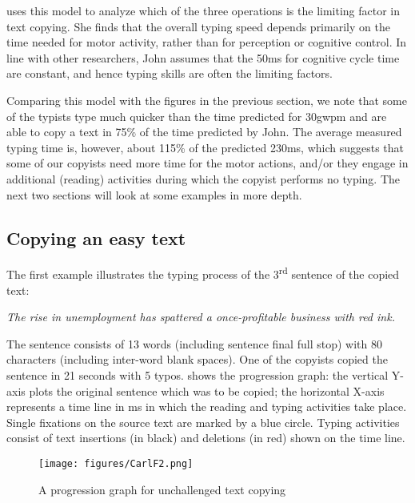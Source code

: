 \documentclass[output=paper]{LSP/langsci}
\begin{document}
\citeauthor{John1996} uses this model to analyze which of the three operations is the limiting factor in text copying. She finds that the overall typing speed depends primarily on the time needed for motor activity, rather than for perception or cognitive control. In line with other researchers, John assumes that the 50ms for cognitive cycle time are constant, and hence typing skills are often the limiting factors.

Comparing this model with the figures in the previous section, we note that some of the typists type much quicker than the time predicted for 30gwpm and are able to copy a text in 75\% of the time predicted by John. The average measured typing time is, however, about 115\% of the predicted 230ms, which suggests that some of our copyists need more time for the motor actions, and/or they engage in additional (reading) activities during which the copyist performs no typing. The next two sections will look at some examples in more depth.

\subsection{Copying an easy text}\label{sec:carl:3.2}
 
The first example illustrates the typing process of the 3\textsuperscript{rd} sentence of the copied text: 

\ea\label{ex:carl:1}
\textit{The rise in unemployment has spattered a once-profitable business with red ink.}
\z

The sentence consists of 13 words (including sentence final full stop) with 80 characters (including inter-word blank spaces). One of the copyists copied the sentence in 21 seconds with 5 typos.  shows the progression graph: the vertical Y-axis plots the original sentence which was to be copied; the horizontal X-axis represents a time line in ms in which the reading and typing activities take place. Single fixations on the source text are marked by a blue circle. Typing activities consist of text insertions (in black) and deletions (in red) shown on the time line. 

\begin{figure}
\texttt{[image: figures/CarlF2.png]}
\caption{A progression graph for unchallenged text copying}
\label{fig:carl:2}
\end{figure}
\end{document}
